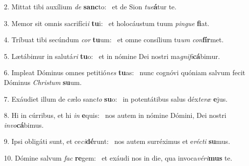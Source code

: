 2. Mittat tibi auxílium \textit{de} \textbf{sanc}to: \ast\  et de Sion \textit{tu}\textit{e}\textbf{á}tur te.\

3. Memor sit omnis sacrifíci\textit{i} \textbf{tu}i: \ast\  et holocáustum tuum \textit{pin}\textit{gue} \textbf{fi}at.\

4. Tríbuat tibi secúndum \textit{cor} \textbf{tu}um: \ast\  et omne consílium tu\textit{um} \textit{con}\textbf{fír}met.\

5. Lætábimur in salutá\textit{ri} \textbf{tu}o: \ast\  et in nómine Dei nostri ma\textit{gni}\textit{fi}\textbf{cá}bimur.\

6. Impleat Dóminus omnes petitió\textit{nes} \textbf{tu}as: \ast\  nunc cognóvi quóniam salvum fecit Dóminus \textit{Chris}\textit{tum} \textbf{su}um.\

7. Exáudiet illum de cælo sanc\textit{to} \textbf{su}o: \ast\  in potentátibus salus déx\textit{te}\textit{ræ} \textbf{e}jus.\

8. Hi in cúrribus, et hi \textit{in} \textbf{e}quis: \ast\  nos autem in nómine Dómini, Dei nostri \textit{in}\textit{vo}\textbf{cá}bimus.\

9. Ipsi obligáti sunt, et ce\textit{ci}\textbf{dé}runt: \ast\  nos autem surréximus et e\textit{réc}\textit{ti} \textbf{su}mus.\

10. Dómine salvum \textit{fac} \textbf{re}gem: \ast\  et exáudi nos in die, qua invoca\textit{vé}\textit{ri}\textbf{mus} te.\

